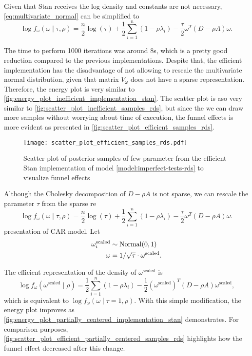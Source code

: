 Given that Stan receives the log density and constants are not necessary,
\eqref{eq:multivariate_normal} can be simplified to
\begin{equation*}
  \log f_{\omega}(\omega \mid \tau, \rho) = \frac{n}{2}\log(\tau) +
  \frac{1}{2}\sum_{i=1}^n(1 - \rho \lambda_i) - \frac{\tau}{2}\omega^T(D - \rho A)\omega.
\end{equation*}

The time to perform 1000 iterations was around 8s, which is a pretty good
reduction compared to the previous implementations. Despite that, the
efficient implementation has the disadvantage of not
allowing to rescale the multivariate normal distribution, given that matrix $V_{\omega}$ does not have
a sparse representation. Therefore, the energy plot is very similar to
\autoref{fig:energy_plot_inefficient_implementation_stan}. The scatter plot is
aso very similar to \autoref{fig:scatter_plot_inefficient_samples_rds}, but
since the we can draw more samples without worrying about time of execution,
the funnel effects is more evident as presented in \autoref{fig:scatter_plot_efficient_samples_rds}.

\begin{figure}[htb]
  \centering
  \caption{\label{fig:scatter_plot_efficient_samples_rds}Scatter plot
    of posterior samples of few parameter from the efficient Stan implementation of model
    \eqref{model:imperfect-tests-rds} to visualize funnel effects}
  \texttt{[image: scatter\_plot\_efficient\_samples\_rds.pdf]}
\end{figure}

Although the Cholesky decomposition of $D - \rho A$ is not sparse, we can
rescale the parameter $\tau$ from the sparse re\begin{equation*}
  \log f_{\omega}(\omega \mid \tau, \rho) = \frac{n}{2}\log(\tau) +
  \frac{1}{2}\sum_{i=1}^n(1 - \rho \lambda_i) - \frac{\tau}{2}\omega^T(D - \rho A)\omega.
\end{equation*}presentation of CAR model. Let
\begin{align*}
  \omega^{\mathrm{scaled}}_i & \sim \operatorname{Normal}(0,1)                                    \\
  \omega                     & = 1/\sqrt{\tau} \cdot \omega^{\mathrm{scaled}}.
\end{align*}

The efficient representation of the density of $\omega^{\mathrm{scaled}}$ is
\begin{equation*}
  \log f_{\omega}(\omega^{\mathrm{scaled}} \mid \rho) =
  \frac{1}{2}\sum_{i=1}^n(1 - \rho \lambda_i)
  - \frac{1}{2}(\omega^{\mathrm{scaled}})^T(D - \rho A)\omega^{\mathrm{scaled}},
\end{equation*}
which is equivalent to $\log f_{\omega}(\omega \mid \tau=1, \rho)$. With this
simple modification, the energy plot improves as
\autoref{fig:energy_plot_partially_centered_implementation_stan} demonstrates.
For comparison purposes,
\autoref{fig:scatter_plot_efficient_partially_centered_samples_rds}
highlights how the funnel effect decreased after this change.

